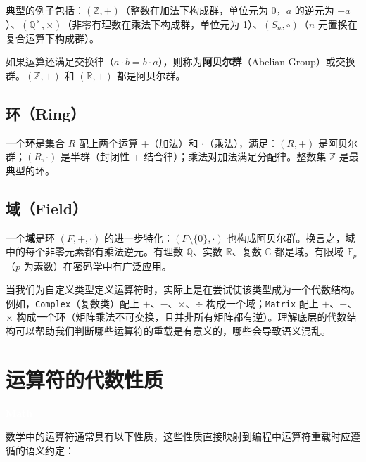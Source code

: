 \documentclass[12pt,a4paper,fontset=fandol]{ctexbook}
\newcommand{\Tp}[1]{\texttt{#1}}
\newcommand{\mathlabel}{%
  \noindent\begin{tcolorbox}[sharp corners,colback=mathheadbg,colframe=mathheadbg,
    left=6pt,right=6pt,top=2pt,bottom=2pt,boxrule=0pt]
  \textcolor{white}{\small\bfseries\sffamily Math}\end{tcolorbox}%
}
\begin{document}
典型的例子包括：$(\mathbb{Z}, +)$（整数在加法下构成群，单位元为 0，$a$ 的逆元为 $-a$）、$(\mathbb{Q}^{\times}, \times)$（非零有理数在乘法下构成群，单位元为 1）、$(S_n, \circ)$（$n$ 元置换在复合运算下构成群）。

如果运算还满足交换律（$a \cdot b = b \cdot a$），则称为\textbf{阿贝尔群}（Abelian Group）或交换群。$(\mathbb{Z}, +)$ 和 $(\mathbb{R}, +)$ 都是阿贝尔群。

\subsection{环（Ring）}

一个\textbf{环}是集合 $R$ 配上两个运算 $+$（加法）和 $\cdot$（乘法），满足：$(R, +)$ 是阿贝尔群；$(R, \cdot)$ 是半群（封闭性 + 结合律）；乘法对加法满足分配律。整数集 $\mathbb{Z}$ 是最典型的环。

\subsection{域（Field）}

一个\textbf{域}是环 $(F, +, \cdot)$ 的进一步特化：$(F \setminus \{0\}, \cdot)$ 也构成阿贝尔群。换言之，域中的每个非零元素都有乘法逆元。有理数 $\mathbb{Q}$、实数 $\mathbb{R}$、复数 $\mathbb{C}$ 都是域。有限域 $\mathbb{F}_p$（$p$ 为素数）在密码学中有广泛应用。

\begin{note}[title=域与编程的关系]
当我们为自定义类型定义运算符时，实际上是在尝试使该类型成为一个代数结构。例如，\Tp{Complex}（复数类）配上 $+$、$-$、$\times$、$\div$ 构成一个域；\Tp{Matrix} 配上 $+$、$-$、$\times$ 构成一个环（矩阵乘法不可交换，且并非所有矩阵都有逆）。理解底层的代数结构可以帮助我们判断哪些运算符的重载是有意义的，哪些会导致语义混乱。
\end{note}

\section{运算符的代数性质}

\mathlabel

数学中的运算符通常具有以下性质，这些性质直接映射到编程中运算符重载时应遵循的语义约定：
\end{document}
